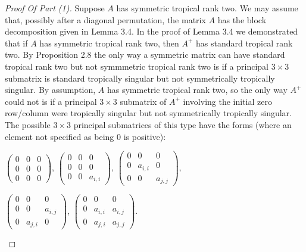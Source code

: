 \documentclass{article}
\begin{document}
\begin{proof}[Proof Of Part (1)]
  Suppose $A$ has symmetric tropical rank two. We may assume that, possibly after a diagonal permutation, the matrix $A$ has the block decomposition given in Lemma 3.4. In the proof of Lemma 3.4 we demonstrated that if $A$ has symmetric tropical rank two, then $A^{+}$ has standard tropical rank two. By Proposition 2.8 the only way a symmetric matrix can have standard tropical rank two but not symmmetric tropical rank two is if a principal $3 \times 3$ submatrix is standard tropically singular but not symmetrically tropically singular. By assumption, $A$ has symmetric tropical rank two, so the only way $A^{+}$ could not is if a principal $3 \times 3$ submatrix of $A^{+}$ involving the initial zero row/column were tropically singular but not symmetrically tropically singular. The possible $3 \times 3$ principal submatrices of this type have the forms (where an element not specified as being $0$ is positive):
  \begin{center}
    $\left(\begin{array}{ccc} 0 & 0 & 0 \\ 0 & 0 & 0 \\ 0 & 0 & 0 \end{array}\right)$, \hspace{.1 in} $\left(\begin{array}{ccc} 0 & 0 & 0 \\ 0 & 0 & 0 \\ 0 & 0 & a_{i,i} \end{array}\right)$, \hspace{.1 in} $\left(\begin{array}{ccc} 0 & 0 & 0 \\ 0 & a_{i,i} & 0 \\ 0 & 0 & a_{j,j} \end{array}\right)$,
    
    $\left(\begin{array}{ccc} 0 & 0 & 0 \\ 0 & 0 & a_{i,j} \\ 0 & a_{j,i} & 0 \end{array}\right)$, \hspace{.1 in} $\left(\begin{array}{ccc} 0 & 0 & 0 \\ 0 & a_{i,i} & a_{i,j} \\ 0 & a_{j,i} & a_{j,j} \end{array}\right)$.
  \end{center}
  

\end{proof}
\end{document}
